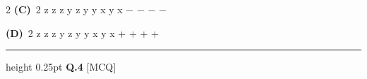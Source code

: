 \documentclass[a4paper,10pt,twoside]{article}
\begin{document}
\begin{multicols}{2}
\textbf{(C)}~2        \newline z \newline z \newline z \newline y \newline z \newline y \newline y \newline x \newline y \newline x \newline − \newline − \newline − \newline −\par\vspace{2pt}\noindent
\textbf{(D)}~2        \newline z \newline z \newline z \newline y \newline z \newline y \newline y \newline x \newline y \newline x \newline + \newline + \newline + \newline +
\par\vspace{6pt}\hrule height 0.25pt\vspace{6pt}
\noindent\textbf{Q.4} \hfill {\footnotesize\textsf{[MCQ]}}
\par\vspace{2pt}

\end{multicols}
\end{document}
